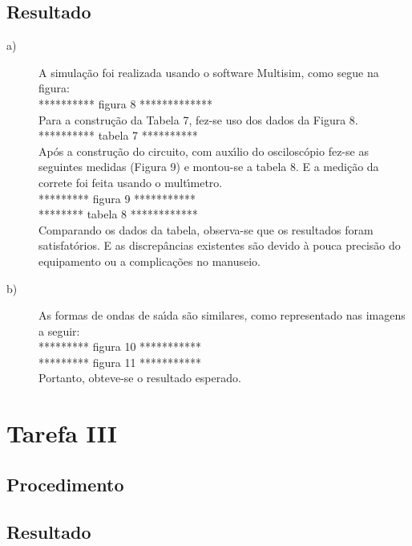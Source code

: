\subsection{Resultado}
\begin{description}
  \item[a)]A simula\c{c}\~{a}o foi realizada usando o software Multisim, como segue na figura: \\

  ********** figura 8 ************* \\

  Para a constru\c{c}\~{a}o da Tabela 7, fez-se uso dos dados da Figura 8. \\

  ********** tabela 7 ********** \\

  Ap\'{o}s a constru\c{c}\~{a}o do circuito, com aux\'{\i}lio do oscilosc\'{o}pio fez-se as seguintes medidas (Figura 9) e montou-se a tabela 8. E a medi\c{c}\~{a}o da correte foi feita usando o mult\'{\i}metro. \\

  ********* figura 9 *********** \\

  ******** tabela 8 ************ \\

  Comparando os dados da tabela, observa-se que os resultados foram satisfat\'{o}rios. E as discrep\^{a}ncias existentes s\~{a}o devido \`{a} pouca precis\~{a}o do equipamento ou a complica\c{c}\~{o}es no manuseio.
  \item[b)]As formas de ondas de sa\'{\i}da s\~{a}o similares, como representado nas imagens a seguir:\\
  
  ********* figura 10 *********** \\
  ********* figura 11 *********** \\
  
  Portanto, obteve-se o resultado esperado. 
\end{description}


\section{Tarefa III}
\subsection{Procedimento}
\subsection{Resultado}

